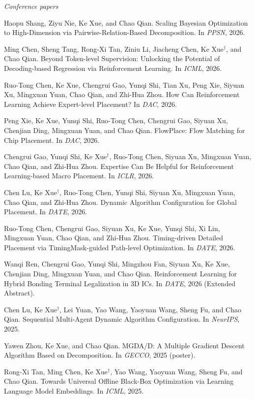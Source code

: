 \documentclass[10pt,a4paper]{article}
\begin{document}
\textit{Conference papers}
\begin{cvbullet}
  \item Haopu Shang, Ziyu Nie, Ke Xue, and Chao Qian. Scaling Bayesian Optimization to High-Dimension via Pairwise-Relation-Based Decomposition. In \textit{PPSN}, 2026.
  \item Ming Chen, Sheng Tang, Rong-Xi Tan, Ziniu Li, Jiacheng Chen, Ke Xue$^\dagger$, and Chao Qian. Beyond Token-level Supervision: Unlocking the Potential of Decoding-based Regression via Reinforcement Learning. In \textit{ICML}, 2026.
  \item Ruo-Tong Chen, Ke Xue, Chengrui Gao, Yunqi Shi, Tian Xu, Peng Xie, Siyuan Xu, Mingxuan Yuan, Chao Qian, and Zhi-Hua Zhou. How Can Reinforcement Learning Achieve Expert-level Placement? In \textit{DAC}, 2026.
  \item Peng Xie, Ke Xue, Yunqi Shi, Ruo-Tong Chen, Chengrui Gao, Siyuan Xu, Chenjian Ding, Mingxuan Yuan, and Chao Qian. FlowPlace: Flow Matching for Chip Placement. In \textit{DAC}, 2026.
  \item Chengrui Gao, Yunqi Shi, Ke Xue$^\dagger$, Ruo-Tong Chen, Siyuan Xu, Mingxuan Yuan, Chao Qian, and Zhi-Hua Zhou. Expertise Can Be Helpful for Reinforcement Learning-based Macro Placement. In \textit{ICLR}, 2026.
  \item Chen Lu, Ke Xue$^\dagger$, Ruo-Tong Chen, Yunqi Shi, Siyuan Xu, Mingxuan Yuan, Chao Qian, and Zhi-Hua Zhou. Dynamic Algorithm Configuration for Global Placement. In \textit{DATE}, 2026.
  \item Ruo-Tong Chen, Chengrui Gao, Siyuan Xu, Ke Xue, Yunqi Shi, Xi Lin, Mingxuan Yuan, Chao Qian, and Zhi-Hua Zhou. Timing-driven Detailed Placement via TimingMask-guided Path-level Optimization. In \textit{DATE}, 2026.
  \item Wanqi Ren, Chengrui Gao, Yunqi Shi, Mingzhou Fan, Siyuan Xu, Ke Xue, Chenjian Ding, Mingxuan Yuan, and Chao Qian. Reinforcement Learning for Hybrid Bonding Terminal Legalization in 3D ICs. In \textit{DATE}, 2026 (Extended Abstract).
  \item Chen Lu, Ke Xue$^\dagger$, Lei Yuan, Yao Wang, Yaoyuan Wang, Sheng Fu, and Chao Qian. Sequential Multi-Agent Dynamic Algorithm Configuration. In \textit{NeurIPS}, 2025.
  \item Yawen Zhou, Ke Xue, and Chao Qian. MGDA/D: A Multiple Gradient Descent Algorithm Based on Decomposition. In \textit{GECCO}, 2025 (poster).
  \item Rong-Xi Tan, Ming Chen, Ke Xue$^\dagger$, Yao Wang, Yaoyuan Wang, Sheng Fu, and Chao Qian. Towards Universal Offline Black-Box Optimization via Learning Language Model Embeddings. In \textit{ICML}, 2025.

\end{cvbullet}
\end{document}
